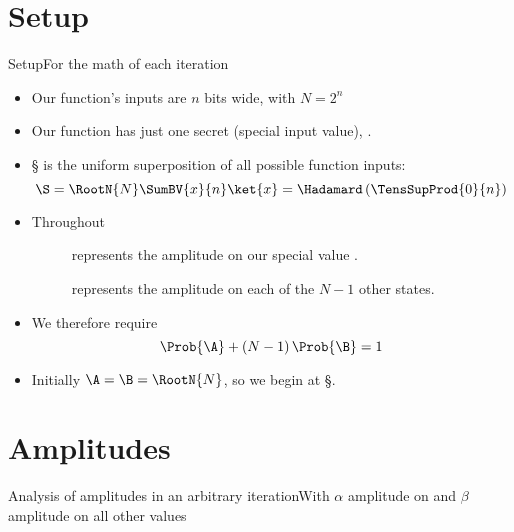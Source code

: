 
\begin{Grover}

\section*{Setup}
\begin{frame}{Setup}{For the math of each iteration}
\begin{itemize}
    \item Our function's inputs are $n$ bits wide, with $N=2^{n}$
    \item Our function has just one secret (special input value),  \W.
    \item \S{} is the uniform superposition of all possible function inputs:
    \[ \S = \RootN{N} \SumBV{x}{n} \ket{x} = \Hadamard\left(\TensSupProd{0}{n}\right)\]
    \item Throughout
    \begin{description}
      \item[\A] represents the amplitude on our special value \W.
    \item[\B] represents the amplitude on each of the $N-1$ other states.
    \end{description}
    \item We therefore require
    \[ \Prob{\A}  + (N-1)\,\Prob{\B} = 1\]
    \item Initially $\A=\B=\RootN{N}$, so we begin at \S.
\end{itemize}
\end{frame}

\section*{Amplitudes}

\begin{frame}{Analysis of amplitudes in an arbitrary iteration}{With $\alpha$ amplitude on  and $\beta$ amplitude on all other values}


\end{frame}
\end{Grover}
